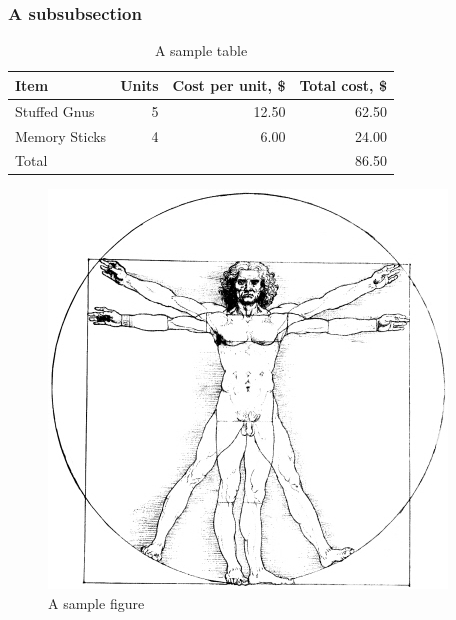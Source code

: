 \documentclass[1p]{afparticle}
\begin{document}
\subsubsection{A subsubsection}

%
%
\begin{table}
  \centering
  \caption{A sample table}
  \label{tab:sample}
  \begin{tabular}{lrrr}
    \toprule
    Item & Units & Cost per unit, \$ & Total cost, \$\\
    \midrule
    Stuffed Gnus &  5  & 12.50  & 62.50 \\
    Memory Sticks & 4  &  6.00  & 24.00\\
    \midrule
    Total & & & 86.50\\
    \bottomrule
  \end{tabular}
\end{table}


%
%
\begin{figure}
  \centering
  \includegraphics{vitruvian}
  \caption{A sample figure}
  \label{fig:sample}
\end{figure}

\lipsum[7-21]





\printbackmatter
\end{document}
